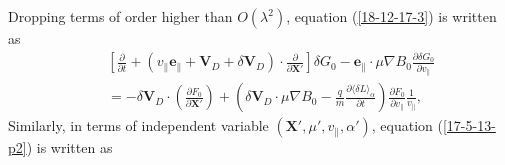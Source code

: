 \documentclass{llncs}
\begin{document}
Dropping terms of order higher than $O (\lambda^2)$, equation
(\ref{18-12-17-3}) is written as
\begin{eqnarray}
  &  & \left[ \frac{\partial}{\partial t} + (v_{\parallel}
  \mathbf{e}_{\parallel} +\mathbf{V}_D + \delta \mathbf{V}_D) \cdot
  \frac{\partial}{\partial \mathbf{X}'} \right] \delta G_0
  -\mathbf{e}_{\parallel} \cdot \mu \nabla B_0 \frac{\partial \delta
  G_0}{\partial v_{\parallel}} \nonumber\\
  &  & = - \delta \mathbf{V}_D \cdot \left( \frac{\partial F_0}{\partial
  \mathbf{X}'} \right) + \left( \delta \mathbf{V}_D \cdot \mu \nabla B_0 -
  \frac{q}{m}  \frac{\partial \langle \delta L \rangle_{\alpha}}{\partial t}
  \right)  \frac{\partial F_0}{\partial v_{\parallel}} 
  \frac{1}{v_{\parallel}}, 
\end{eqnarray}
Similarly, in terms of independent variable $(\mathbf{X}', \mu',
v_{\parallel}, \alpha')$, equation (\ref{17-5-13-p2}) is written as
\end{document}
